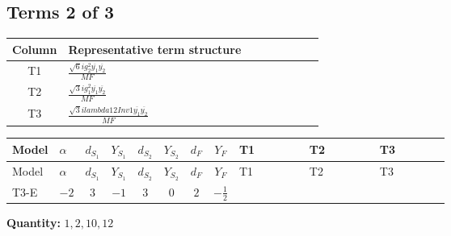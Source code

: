 \documentclass[8pt]{article}
\begin{document}
\begin{landscape}
\subsection*{Terms 2 of 3}
\begin{center}
\begin{tabular}{@{}c >{\raggedright\arraybackslash}p{0.82\linewidth}@{}}
\toprule
Column & Representative term structure \\
\midrule
T1 & \(\displaystyle \frac{\sqrt{6} i g_{2}^{2} \overline{y_{1}} \overline{y_{2}}}{MF}\) \\
\midrule
T2 & \(\displaystyle \frac{\sqrt{3} i g_{1}^{2} \overline{y_{1}} \overline{y_{2}}}{MF}\) \\
\midrule
T3 & \(\displaystyle \frac{\sqrt{3} i lambda12Inv1 \overline{y_{1}} \overline{y_{2}}}{MF}\) \\
\midrule
\bottomrule
\end{tabular}
\end{center}
\smallskip
\tiny
\begin{longtable}{@{}llcccccc >{\raggedright\arraybackslash}p{0.21\linewidth} >{\raggedright\arraybackslash}p{0.21\linewidth} >{\raggedright\arraybackslash}p{0.21\linewidth}@{}}
\toprule
Model & $\alpha$ & $d_{S_1}$ & $Y_{S_1}$ & $d_{S_2}$ & $Y_{S_2}$ & $d_F$ & $Y_F$ & T1 & T2 & T3 \\
\midrule
\endfirsthead
\toprule
Model & $\alpha$ & $d_{S_1}$ & $Y_{S_1}$ & $d_{S_2}$ & $Y_{S_2}$ & $d_F$ & $Y_F$ & T1 & T2 & T3 \\
\midrule
\endhead
T3-E & $-2$ & $3$ & $-1$ & $3$ & $0$ & $2$ & $-\frac{1}{2}$ & \scriptsize\adjustbox{max width=\linewidth}{$\begin{gathered} - \frac{\sqrt{6} i g_{2}^{2} \overline{y_{1}} \overline{y_{2}}}{6 MF}\end{gathered}$} & \scriptsize\adjustbox{max width=\linewidth}{$\begin{gathered} - \frac{\sqrt{3} i g_{1}^{2} \overline{y_{1}} \overline{y_{2}}}{8 MF}\end{gathered}$} & \scriptsize\adjustbox{max width=\linewidth}{$\begin{gathered} \frac{\sqrt{3} i lambda12Inv1 \overline{y_{1}} \overline{y_{2}}}{6 MF}\end{gathered}$} \\
\midrule
\bottomrule
\end{longtable}
\clearpage
\noindent\textbf{Quantity: }$\mathrm{1,2,10,12}$\par\smallskip

\end{landscape}
\end{document}

